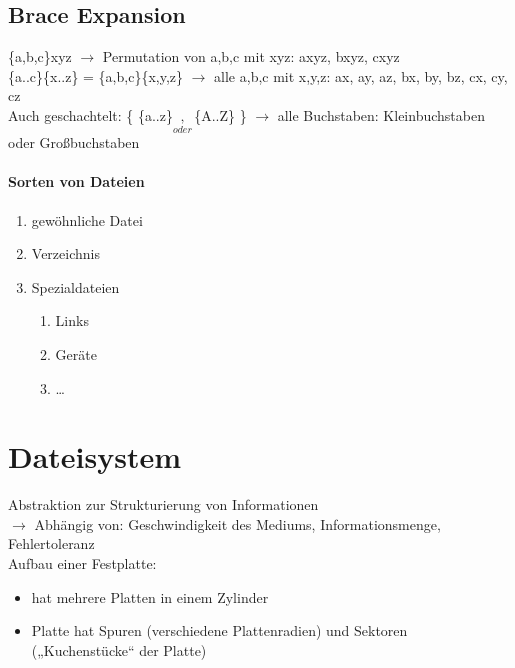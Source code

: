 \subsection{Brace Expansion}
\{a,b,c\}xyz $\to$ Permutation von a,b,c mit xyz: axyz, bxyz, cxyz\\
\{a..c\}\{x..z\} = \{a,b,c\}\{x,y,z\} $\to$ alle a,b,c mit x,y,z: ax, ay, az, bx, by, bz, cx, cy, cz\\
Auch geschachtelt: \{ \{a..z\}$\underset{oder}{,}$\{A..Z\} \} $\to$ alle Buchstaben: Kleinbuchstaben oder Großbuchstaben


\paragraph{Sorten von Dateien}
\begin{enumerate}
\item gewöhnliche Datei
\item Verzeichnis
\item Spezialdateien
\begin{enumerate} [label=$\to$]
\item Links
\item Geräte
\item …
\end{enumerate}
\end{enumerate}

\section{Dateisystem}
Abstraktion zur Strukturierung von Informationen\\
$\rightarrow$ Abhängig von: Geschwindigkeit des Mediums, Informationsmenge, Fehlertoleranz\\
Aufbau einer Festplatte:
\begin{itemize}
\item hat mehrere Platten in einem Zylinder
\item Platte hat Spuren (verschiedene Plattenradien) und Sektoren („Kuchenstücke“ der Platte)
\end{itemize}
